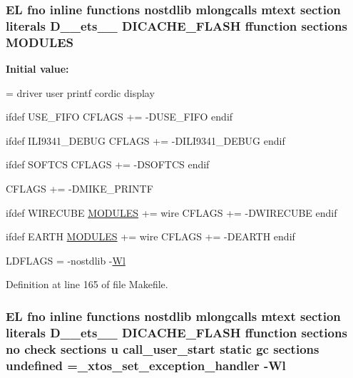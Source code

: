 \hypertarget{Makefile_af8b8a61c029c5ab0a5518b7f5421c6ac}{
\subsubsection[{M\-O\-D\-U\-L\-E\-S}]{\setlength{\rightskip}{0pt plus 5cm}E\-L fno inline functions nostdlib mlongcalls mtext section literals D\-\_\-\-\_\-ets\-\_\-\-\_\- D\-I\-C\-A\-C\-H\-E\-\_\-\-F\-L\-A\-S\-H ffunction sections M\-O\-D\-U\-L\-E\-S}}\label{Makefile_af8b8a61c029c5ab0a5518b7f5421c6ac}
{\bfseries Initial value\-:}
\begin{DoxyCode}
= driver user printf cordic display


ifdef USE\_FIFO
    CFLAGS  += -DUSE\_FIFO
endif

ifdef ILI9341\_DEBUG
    CFLAGS  += -DILI9341\_DEBUG
endif
    
ifdef SOFTCS
    CFLAGS  += -DSOFTCS
endif

CFLAGS  += -DMIKE\_PRINTF

ifdef WIRECUBE
    \hyperlink{Makefile_af8b8a61c029c5ab0a5518b7f5421c6ac}{MODULES}  += wire
    CFLAGS  += -DWIRECUBE
endif

ifdef EARTH
    \hyperlink{Makefile_af8b8a61c029c5ab0a5518b7f5421c6ac}{MODULES}  += wire
    CFLAGS  += -DEARTH
endif



LDFLAGS     = -nostdlib -\hyperlink{Makefile_afb1782b240d70229ae5bc6b111f9794a}{Wl}
\end{DoxyCode}


Definition at line 165 of file Makefile.

\hypertarget{Makefile_a9324bb2c20136255586f3b51593c4291}{
\subsubsection[{undefined}]{\setlength{\rightskip}{0pt plus 5cm}E\-L fno inline functions nostdlib mlongcalls mtext section literals D\-\_\-\-\_\-ets\-\_\-\-\_\- D\-I\-C\-A\-C\-H\-E\-\_\-\-F\-L\-A\-S\-H ffunction sections no check sections u call\-\_\-user\-\_\-start static gc sections undefined =\-\_\-xtos\-\_\-set\-\_\-exception\-\_\-handler -\/{\bf Wl}\hspace{0.3cm}{\ttfamily [static]}}}\label{Makefile_a9324bb2c20136255586f3b51593c4291}


